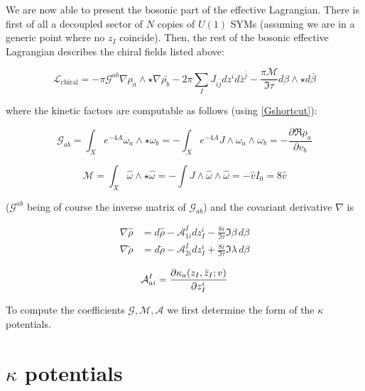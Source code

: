 We are now able to present the bosonic part of the effective Lagrangian. There is first of all a decoupled sector of $N$ copies of $U(1)$ SYMs (assuming we are in a generic point where no $z_I$ coincide). Then, the rest of the bosonic effective Lagrangian describes the chiral fields listed above:

\begin{equation}
	\mathcal{L}_\mathrm{chiral} = - \pi \mathcal{G}^{ab} \nabla \rho_a \wedge \star \nabla \bar {\rho_b} - 2 \pi \sum_I J_{i\bar j} dz^i d\bar{z}^{\bar j} - \frac{\pi\mathcal{M}}{\Im \tau} d\beta \wedge \star d\bar\beta
	\label{}
\end{equation}

where the kinetic factors are computable as follows (using \ref{Gshortcut}):

\begin{equation}
	\mathcal{G}_{ab} = \int_X e^{-4A} \omega_a \wedge \star \omega_b = - \int_X e^{-4A} J \wedge \omega_a \wedge \omega_b = - \frac{\partial \Re \rho_a}{\partial v_b}
	\label{}
\end{equation}

\begin{equation}
	\mathcal{M} = \int_X \hat \omega \wedge \star \hat \omega = - \int J \wedge \hat \omega \wedge \hat \omega = - \hat v I_0 = 8 \hat v
	\label{}
\end{equation}

($\mathcal G^{ab}$ being of course the inverse matrix of $\mathcal G_{ab}$) and the covariant derivative $\nabla$ is

\begin{align}
	\nabla \hat \rho &= d \hat \rho - \mathcal{A}_{1i}^{I} dz_I^i - \frac{8i}{\Im \tau} \Im \beta \, d\beta\\
	\nabla \tilde \rho &= d \tilde \rho - \mathcal{A}_{2i}^{I} dz_I^i + \frac{8i}{\Im \tau} \Im \lambda \, d\beta
	\label{}
\end{align}

\begin{equation}
	\mathcal{A}_{ai}^I = \frac{\partial\kappa_a(z_I,\bar z_I; v)}{\partial z_I^i}
	\label{}
\end{equation}

To compute the coefficients $\mathcal{G},\mathcal{M},\mathcal{A}$ we first determine the form of the $\kappa$ potentials.

\section{$\kappa$ potentials}

